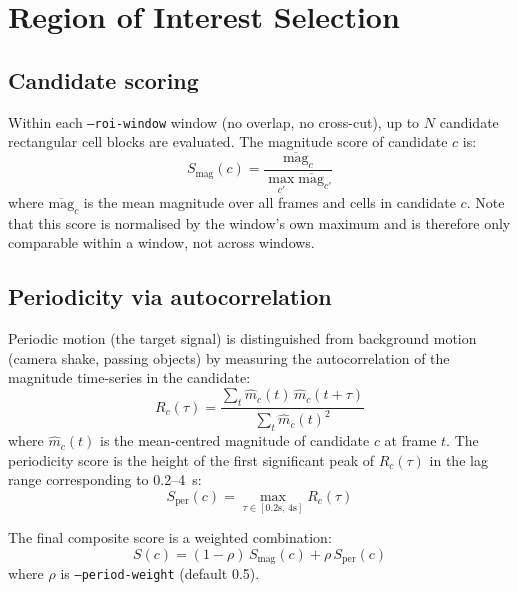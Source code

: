 \documentclass[12pt,a4paper]{article}
\begin{document}
\section{Region of Interest Selection}
\label{sec:roi-detail}

\subsection{Candidate scoring}

Within each \texttt{--roi-window} window (no overlap, no cross-cut), up to $N$
candidate rectangular cell blocks are evaluated. The magnitude score of
candidate $c$ is:
\begin{equation}
  S_\mathrm{mag}(c) = \frac{\overline{\mathrm{mag}}_c}
                           {\max_{c'} \overline{\mathrm{mag}}_{c'}}
\end{equation}
where $\overline{\mathrm{mag}}_c$ is the mean magnitude over all frames and
cells in candidate $c$. Note that this score is normalised by the window's own
maximum and is therefore only comparable within a window, not across windows.

\subsection{Periodicity via autocorrelation}

Periodic motion (the target signal) is distinguished from background motion
(camera shake, passing objects) by measuring the autocorrelation of the
magnitude time-series in the candidate:
\begin{equation}
  R_c(\tau) = \frac{\sum_t \hat{m}_c(t)\,\hat{m}_c(t+\tau)}
                   {\sum_t \hat{m}_c(t)^2}
  \label{eq:autocorr}
\end{equation}
where $\hat{m}_c(t)$ is the mean-centred magnitude of candidate $c$ at frame
$t$. The periodicity score is the height of the first significant peak of
$R_c(\tau)$ in the lag range corresponding to 0.2--4~s:
\begin{equation}
  S_\mathrm{per}(c) = \max_{\tau \in [0.2\text{s},\, 4\text{s}]} R_c(\tau)
\end{equation}

The final composite score is a weighted combination:
\begin{equation}
  S(c) = (1 - \rho)\,S_\mathrm{mag}(c) + \rho\,S_\mathrm{per}(c)
  \label{eq:score}
\end{equation}
where $\rho$ is \texttt{--period-weight} (default 0.5).
\end{document}
